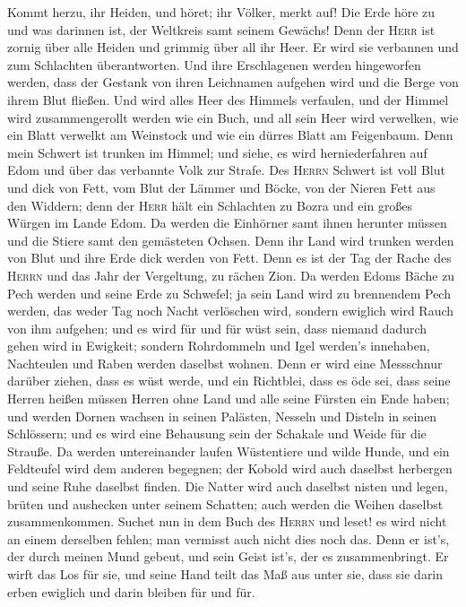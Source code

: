  Kommt herzu, ihr Heiden, und höret; ihr Völker, merkt
auf! Die Erde höre zu und was darinnen ist, der Weltkreis samt seinem
Gewächs!  Denn der \textsc{Herr} ist zornig über alle
Heiden und grimmig über all ihr Heer. Er wird sie verbannen und zum
Schlachten überantworten.  Und ihre Erschlagenen werden
hingeworfen werden, dass der Gestank von ihren Leichnamen aufgehen wird
und die Berge von ihrem Blut fließen.  Und wird alles Heer
des Himmels verfaulen, und der Himmel wird zusammengerollt werden wie
ein Buch, und all sein Heer wird verwelken, wie ein Blatt verwelkt am
Weinstock und wie ein dürres Blatt am Feigenbaum.  Denn
mein Schwert ist trunken im Himmel; und siehe, es wird herniederfahren
auf Edom und über das verbannte Volk zur Strafe.  Des
\textsc{Herrn} Schwert ist voll Blut und dick von Fett, vom Blut der
Lämmer und Böcke, von der Nieren Fett aus den Widdern; denn der
\textsc{Herr} hält ein Schlachten zu Bozra und ein großes Würgen im
Lande Edom.  Da werden die Einhörner samt ihnen herunter
müssen und die Stiere samt den gemästeten Ochsen. Denn ihr Land wird
trunken werden von Blut und ihre Erde dick werden von Fett.
 Denn es ist der Tag der Rache des \textsc{Herrn} und das
Jahr der Vergeltung, zu rächen Zion.  Da werden Edoms
Bäche zu Pech werden und seine Erde zu Schwefel; ja sein Land wird zu
brennendem Pech werden,  das weder Tag noch Nacht
verlöschen wird, sondern ewiglich wird Rauch von ihm aufgehen; und es
wird für und für wüst sein, dass niemand dadurch gehen wird in Ewigkeit;
 sondern Rohrdommeln und Igel werden's innehaben,
Nachteulen und Raben werden daselbst wohnen. Denn er wird eine
Messschnur darüber ziehen, dass es wüst werde, und ein Richtblei, dass
es öde sei,  dass seine Herren heißen müssen Herren ohne
Land und alle seine Fürsten ein Ende haben;  und werden
Dornen wachsen in seinen Palästen, Nesseln und Disteln in seinen
Schlössern; und es wird eine Behausung sein der Schakale und Weide für
die Strauße.  Da werden untereinander laufen Wüstentiere
und wilde Hunde, und ein Feldteufel wird dem anderen begegnen; der
Kobold wird auch daselbst herbergen und seine Ruhe daselbst finden.
 Die Natter wird auch daselbst nisten und legen, brüten
und aushecken unter seinem Schatten; auch werden die Weihen daselbst
zusammenkommen.  Suchet nun in dem Buch des
\textsc{Herrn} und leset! es wird nicht an einem derselben fehlen; man
vermisst auch nicht dies noch das. Denn er ist's, der durch meinen Mund
gebeut, und sein Geist ist's, der es zusammenbringt.  Er
wirft das Los für sie, und seine Hand teilt das Maß aus unter sie, dass
sie darin erben ewiglich und darin bleiben für und für.

